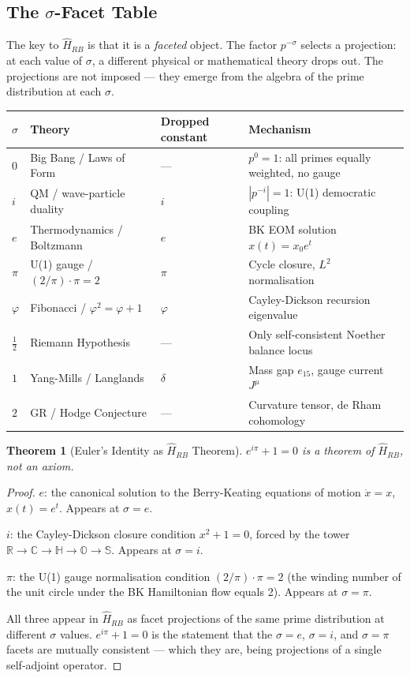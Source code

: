 \documentclass[12pt,a4paper]{article}
\newtheorem{theorem}{Theorem}[section]
\theoremstyle{definition}
\theoremstyle{remark}
\newcommand{\Hrb}{\hat{H}_{RB}}
\newcommand{\gap}{\delta}
\newcommand{\half}{\tfrac{1}{2}}
\begin{document}
\subsection{The $\sigma$-Facet Table}

The key to $\Hrb$ is that it is a \emph{faceted} object.
The factor $p^{-\sigma}$ selects a projection: at each value of $\sigma$, a different
physical or mathematical theory drops out.
The projections are not imposed --- they emerge from the algebra of the prime
distribution at each $\sigma$.

\begin{center}
\begin{tabular}{llll}
\toprule
$\sigma$ & Theory & Dropped constant & Mechanism \\
\midrule
$0$ & Big Bang / Laws of Form & --- & $p^0=1$: all primes equally weighted, no gauge \\
$i$ & QM / wave-particle duality & $i$ & $|p^{-i}|=1$: U(1) democratic coupling \\
$e$ & Thermodynamics / Boltzmann & $e$ & BK EOM solution $x(t)=x_0 e^t$ \\
$\pi$ & U(1) gauge / $(2/\pi)\cdot\pi=2$ & $\pi$ & Cycle closure, $L^2$ normalisation \\
$\varphi$ & Fibonacci / $\varphi^2=\varphi+1$ & $\varphi$ & Cayley-Dickson recursion eigenvalue \\
$\half$ & Riemann Hypothesis & --- & Only self-consistent Noether balance locus \\
$1$ & Yang-Mills / Langlands & $\gap$ & Mass gap $e_{15}$, gauge current $J^\mu$ \\
$2$ & GR / Hodge Conjecture & --- & Curvature tensor, de Rham cohomology \\
\bottomrule
\end{tabular}
\end{center}

\begin{theorem}[Euler's Identity as $\Hrb$ Theorem]
$e^{i\pi} + 1 = 0$ is a theorem of $\Hrb$, not an axiom.
\end{theorem}
\begin{proof}
$e$: the canonical solution to the Berry-Keating equations of motion $\dot{x} = x$,
$x(t) = e^t$. Appears at $\sigma = e$.

$i$: the Cayley-Dickson closure condition $x^2 + 1 = 0$, forced by the tower
$\mathbb{R}\to\mathbb{C}\to\mathbb{H}\to\mathbb{O}\to\mathbb{S}$.
Appears at $\sigma = i$.

$\pi$: the U(1) gauge normalisation condition $(2/\pi)\cdot\pi = 2$ (the winding number
of the unit circle under the BK Hamiltonian flow equals 2).
Appears at $\sigma = \pi$.

All three appear in $\Hrb$ as facet projections of the same prime distribution at
different $\sigma$ values.
$e^{i\pi} + 1 = 0$ is the statement that the $\sigma=e$, $\sigma=i$, and $\sigma=\pi$
facets are mutually consistent --- which they are, being projections of a single
self-adjoint operator.
\end{proof}
\end{document}
